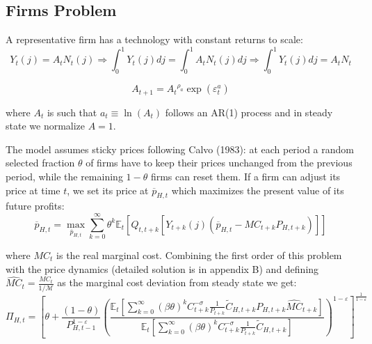 \documentclass{article}
\newcommand{\Et}{\mathbb{E}_t}
\begin{document}
\subsection{Firms Problem}

A representative firm has a technology with constant returns to scale:
\begin{equation}
    \label{technology}
    Y_t(j) = A_t N_t(j) \Rightarrow \int^1_0 Y_t(j) dj = \int^1_0 A_t N_t(j) dj \Rightarrow \int^1_0 Y_t(j) dj = A_t N_t 
\end{equation}

\begin{equation}
    \label{tfp}
    A_{t+1} = {A_t}^{\rho_a}\exp( \varepsilon^a_t)
\end{equation}

where $A_t$ is such that $a_t \equiv \ln(A_t)$ follows an AR(1) process and in steady state we normalize $A = 1$.

\vspace{6pt}

The model assumes sticky prices following Calvo (1983): at each period a random selected fraction $\theta$ of firms have to keep their prices unchanged from the previous period, while the remaining $1-\theta$ firms can reset them. If a firm can adjust its price at time $t$, we set its price at $\overline{p}_{H,t}$ which maximizes the present value of its future profits:
\begin{equation}
    \overline{p}_{H,t} = \max_{\overline{p}_{H,t}} \sum^\infty_{k=0} \theta^k \Et \left[ Q_{t, t+k}[Y_{t+k}(j) (\overline{p}_{H,t} - MC_{t+k} P_{H,t+k})] \right]
\end{equation}

where $MC_t$ is the real marginal cost. Combining the first order of this problem with the price dynamics (detailed solution is in appendix B) and defining $\widehat{MC}_t = \frac{MC_t}{1/ \mathcal M}$ as the marginal cost deviation from steady state we get:
\begin{equation}
    \label{nkpc}
    \Pi_{H,t} = \left[ \theta + \frac{(1-\theta)}{P_{H,t-1}^{1-\varepsilon}} \left(\frac{\Et\left[ \sum^\infty_{k=0} (\beta\theta)^k C_{t+k}^{-\sigma} \frac{1}{P_{t+k}}\widetilde C_{H,t+k} P_{H,t+k} \widehat{MC}_{t+k}\right] }{\Et\left[ \sum^\infty_{k=0} (\beta\theta)^k C_{t+k}^{-\sigma} \frac{1}{P_{t+k}} \widetilde C_{H,t+k}  \right]} \right)^{1-\varepsilon}\right]^\frac{1}{1-\varepsilon}
\end{equation}
\end{document}
